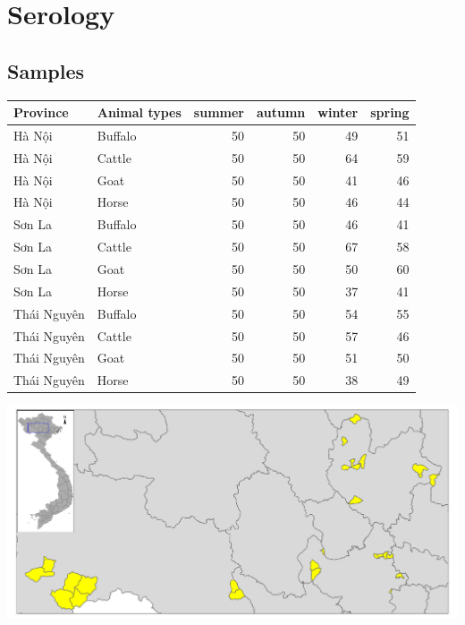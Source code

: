 \section{Serology}
\subsection{Samples}

\begin{frame}
\begin{table}[ht]
\centering
\begin{tabular}{llrrrr}
  \toprule
Province & Animal types & summer & autumn & winter & spring \\
  \midrule
Hà Nội & Buffalo &  50 &  50 &  49 &  51 \\
  Hà Nội & Cattle &  50 &  50 &  64 &  59 \\
  Hà Nội & Goat &  50 &  50 &  41 &  46 \\
  Hà Nội & Horse &  50 &  50 &  46 &  44 \\
  Sơn La & Buffalo &  50 &  50 &  46 &  41 \\
  Sơn La & Cattle &  50 &  50 &  67 &  58 \\
  Sơn La & Goat &  50 &  50 &  50 &  60 \\
  Sơn La & Horse &  50 &  50 &  37 &  41 \\
  Thái Nguyên & Buffalo &  50 &  50 &  54 &  55 \\
  Thái Nguyên & Cattle &  50 &  50 &  57 &  46 \\
  Thái Nguyên & Goat &  50 &  50 &  51 &  50 \\
  Thái Nguyên & Horse &  50 &  50 &  38 &  49 \\
   \bottomrule
\end{tabular}
\end{table}

\end{frame}

\begin{frame}
\begin{center}
\includegraphics[width=1\textwidth]{map01.pdf}
\end{center}
\end{frame}

